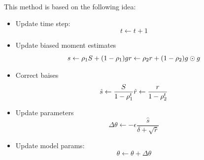 This method is based on the following idea:
\begin{itemize}
    \item Update time step:
          \begin{equation}
              t \gets t + 1
          \end{equation}
    \item Update biased moment estimates
          \begin{equation}
              s \gets \rho_1 S + (1 - \rho_1)g \\
              r \gets \rho_2 r + (1 - \rho_2) g \odot g
          \end{equation}
    \item Correct baises
          \begin{equation}
              \hat{s} \gets \frac{S}{1 - \rho_1^t} \\
              \hat{r} \gets \frac{r}{1 - \rho_2^t}
          \end{equation}
    \item Update parameters
          \begin{equation}
              \Delta \theta \gets - \epsilon \frac{\hat{s}}{\delta + \sqrt{\hat{r}}}
          \end{equation}
    \item Update model params:
          \begin{equation}
              \theta \gets \theta + \Delta \theta
          \end{equation}
\end{itemize}